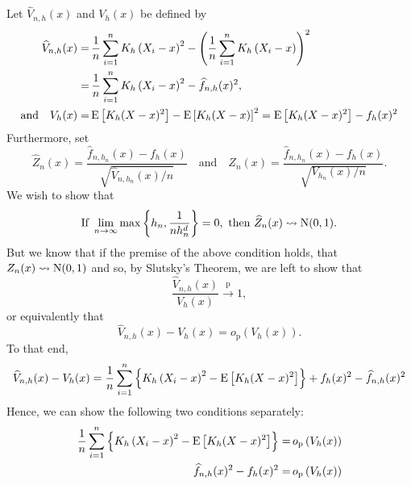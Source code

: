 Let \(\widehat{V}_{n, h} (x)\) and \(V_{h} (x)\) be defined by
\begin{equation}
  \begin{split}
  \widehat{V}_{n, h} (x) =
  & \, \frac{1}{n} \sum_{i = 1}^{n} K_{h} \left( X_{i} - x \right)^{2} - \left(
  \frac{1}{n} \sum_{i = 1}^{n} K_{h} \left( X_{i} - x \right) \right)^{2} \\
  =
  & \, \frac{1}{n} \sum_{i = 1}^{n} K_{h} \left( X_{i} - x \right)^{2} -
  \widehat{f}_{n, h} (x)^{2}, \\
  \text{and} \quad
  V_{h} (x) =
  & \, \mathrm{E} \left[ K_{h} (X - x)^{2} \right] - \mathrm{E} \left[ K_{h} (X - x) \right]^{2}
  = \mathrm{E} \left[ K_{h} (X - x)^{2} \right] - f_{h} (x)^{2}
  \end{split}
\end{equation}
Furthermore, set
\begin{equation*}
  \widehat{Z}_{n} (x) = \frac{\widehat{f}_{n, h_{n}} (x) - f_{h}
  (x)}{\sqrt{\widehat{V}_{n, h_{n}} (x) / n}} \quad \text{and} \quad Z_{n} (x) =
  \frac{\widehat{f}_{n, h_{n}} (x) - f_{h} (x)}{\sqrt{V_{h_{n}} (x) / n}}.
\end{equation*}
We wish to show that
\begin{equation*}
  \text{If }
  \lim_{n \to \infty} \max \left\{ h_{n}, \frac{1}{n h_{n}^{d}} \right\} = 0,
  \text{ then } \widehat{Z}_{n} (x) \rightsquigarrow \mathrm{N} (0, 1).
\end{equation*}
But we know that if the premise of the above condition holds, that \(Z_{n} (x)
\rightsquigarrow \mathrm{N} (0, 1)\) and so, by Slutsky's Theorem, we are left to show
that
\begin{equation*}
  \frac{\widehat{V}_{n, h} (x)}{V_{h} (x)} \overset{\mathrm{p}}{\to} 1,
\end{equation*}
or equivalently that
\begin{equation*}
  \widehat{V}_{n, h} (x) - V_{h} (x) = o_{\mathrm{p}} \left( V_{h} (x) \right).
\end{equation*}
To that end,
\begin{equation*}
  \widehat{V}_{n, h} (x) - V_{h} (x) = \frac{1}{n} \sum_{i = 1}^{n} \left\{
  K_{h} \left( X_{i} - x \right)^{2} - \mathrm{E} \left[ K_{h} (X - x)^{2} \right]
  \right\} + f_{h} (x)^{2} - \widehat{f}_{n, h} (x)^{2}
\end{equation*}
Hence, we can show the following two conditions separately:
\begin{align}
  \frac{1}{n} \sum_{i = 1}^{n} \left\{
  K_{h} \left( X_{i} - x \right)^{2} - \mathrm{E} \left[ K_{h} (X - x)^{2} \right]
  \right\} =
  & \,  o_{\mathrm{p}} \left( V_{h} (x) \right) \\
  \widehat{f}_{n, h} (x)^{2} - f_{h} (x)^{2} =
  & \, o_{\mathrm{p}} \left( V_{h} (x)
  \right)
\end{align}
